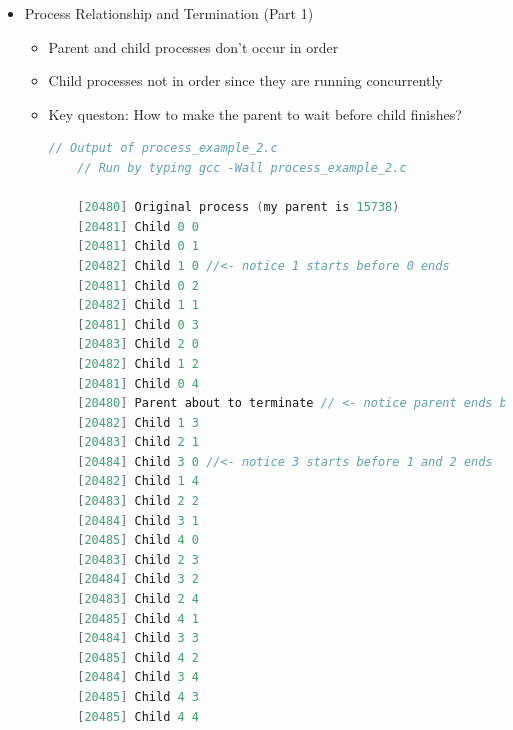 \documentclass[12pt]{article}
\begin{document}
\begin{itemize}
    \item Process Relationship and Termination (Part 1)
    \begin{itemize}
        \item Parent and child processes don't occur in order
        \item Child processes not in order since they are running concurrently
        \item Key queston: How to make the parent to wait before child finishes?
    \begin{lstlisting}[language=c]
    // Output of process_example_2.c
    // Run by typing gcc -Wall process_example_2.c

    [20480] Original process (my parent is 15738)
    [20481] Child 0 0
    [20481] Child 0 1
    [20482] Child 1 0 //<- notice 1 starts before 0 ends
    [20481] Child 0 2
    [20482] Child 1 1
    [20481] Child 0 3
    [20483] Child 2 0
    [20482] Child 1 2
    [20481] Child 0 4
    [20480] Parent about to terminate // <- notice parent ends before children
    [20482] Child 1 3
    [20483] Child 2 1
    [20484] Child 3 0 //<- notice 3 starts before 1 and 2 ends
    [20482] Child 1 4
    [20483] Child 2 2
    [20484] Child 3 1
    [20485] Child 4 0
    [20483] Child 2 3
    [20484] Child 3 2
    [20483] Child 2 4
    [20485] Child 4 1
    [20484] Child 3 3
    [20485] Child 4 2
    [20484] Child 3 4
    [20485] Child 4 3
    [20485] Child 4 4
    \end{lstlisting}
    \end{itemize}
\end{itemize}
\end{document}
